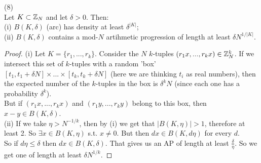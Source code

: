 \documentclass[a4paper]{article}
\begin{document}
\begin{lemma} (8)\\
    Let $K \subset \mathbb{Z}_N$ and let $\delta > 0$. Then:\\
    (i) $B(K,\delta)$ (arc) has density at least $\delta^{|K|}$;\\
    (ii) $B(K,\delta)$ contains a mod-$N$ artihmetic progression of length at least $\delta N^{1/|K|}$.
    \begin{proof}
        (i) Let $K = \{r_1,...,r_k\}$. Consider the $N$ $k$-tuples $(r_1x,...,r_kx) \in \mathbb{Z}_N^k$. If we intersect this set of $k$-tuples with a random 'box' $[t_1,t_1+\delta N] \times ... \times [t_k,t_k+\delta N]$ (here we are thinking $t_i$ as real numbers), then the expected number of the $k$-tuples in the box is $\delta^k N$ (since each one has a probability $\delta^k$).\\
        But if $(r_1x,...,r_kx)$ and $(r_1y,...,r_ky)$ belong to this box, then $x-y \in B(K,\delta)$.\\
        (ii) If we take $\eta > N^{-1/k}$, then by (i) we get that $|B(K,\eta)| > 1$, therefore at least 2. So $\exists x \in B(K,\eta)$ s.t. $x \neq 0$. But then $dx\in B(K,d\eta)$ for every $d$.\\
        So if $d\eta \leq \delta$ then $dx \in B(K,\delta)$. That gives us an AP of length at least $\frac{\delta}{\eta}$. So we get one of length at least $\delta N^{1/k}$.
    \end{proof}
\end{lemma}
\end{document}
